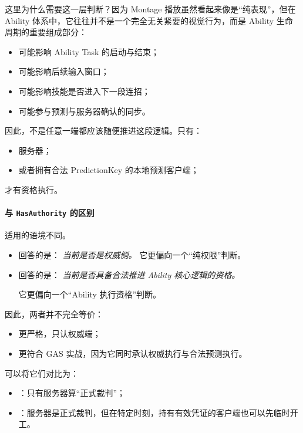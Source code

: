 这里为什么需要这一层判断？因为 Montage 播放虽然看起来像是“纯表现”，但在 Ability 体系中，它往往并不是一个完全无关紧要的视觉行为，而是 Ability 生命周期的重要组成部分：

\begin{itemize}
	\item 可能影响 Ability Task 的启动与结束；
	\item 可能影响后续输入窗口；
	\item 可能影响技能是否进入下一段连招；
	\item 可能参与预测与服务器确认的同步。
\end{itemize}

因此，不是任意一端都应该随便推进这段逻辑。只有：
\begin{itemize}
	\item 服务器；
	\item 或者拥有合法 PredictionKey 的本地预测客户端；
\end{itemize}
才有资格执行。

\paragraph{与 \texttt{HasAuthority} 的区别}
适用的语境不同。
\begin{itemize}
	\item {} 回答的是：	\emph{当前是否是权威侧。}
	它更偏向一个“纯权限”判断。
	
	\item  {} 回答的是：
	\emph{当前是否具备合法推进 Ability 核心逻辑的资格。}
	
	它更偏向一个“Ability 执行资格”判断。
	
\end{itemize}
因此，两者并不完全等价：

\begin{itemize}
	\item {} 更严格，只认权威端；
	\item {} 更符合 GAS 实战，因为它同时承认权威执行与合法预测执行。
\end{itemize}

可以将它们对比为：

\begin{itemize}
	\item {}：只有服务器算“正式裁判”；
	\item {}：服务器是正式裁判，但在特定时刻，持有有效凭证的客户端也可以先临时开工。
\end{itemize}

